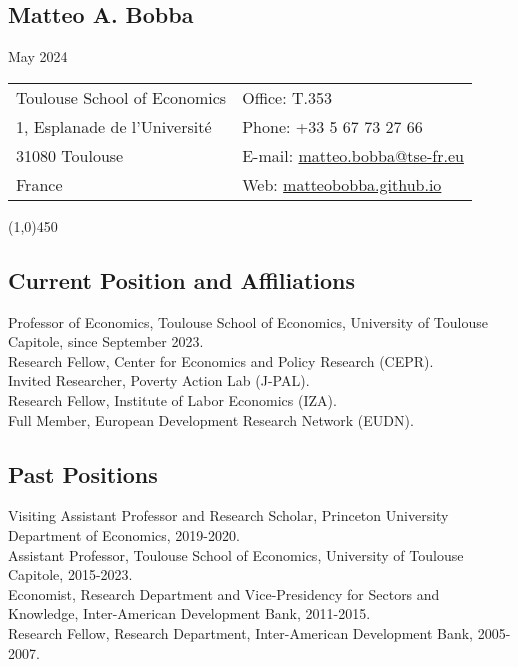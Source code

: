 \documentclass[12pt,english]{article}
\begin{document}


\noindent
\begin{center}
\section*{Matteo A. Bobba} \vspace{-0.3cm}
May 2024
\end{center} 
\begin{tabular}{p{9cm}p{9cm}}
Toulouse School of Economics &  Office: T.353  \\ 
1, Esplanade de l'Universit\'{e} & Phone: +33 5 67 73 27 66\\
31080 Toulouse  &  E-mail: \href{mailto: matteo.bobba@tse-fr.eu}{matteo.bobba@tse-fr.eu} \\
France & Web: \href{https://matteobobba.github.io/}{matteobobba.github.io}  \\
\end{tabular}
\vspace{-0.1cm}
\line(1,0){450} \\
\vspace{-0.3cm}

\subsection*{Current Position and Affiliations}
Professor of Economics, Toulouse School of Economics, University of Toulouse Capitole, since September 2023. \vspace{0.2cm} \\ 
Research Fellow, Center for Economics and Policy Research (CEPR).\vspace{0.2cm} \\
Invited Researcher, Poverty Action Lab (J-PAL). \vspace{0.2cm} \\ 
Research Fellow, Institute of Labor Economics (IZA). \vspace{0.2cm} \\ 
Full Member, European Development Research Network (EUDN).

\subsection*{Past Positions}
Visiting Assistant Professor and Research Scholar, Princeton University Department of Economics, 2019-2020. \vspace{0.2cm} \\
Assistant Professor, Toulouse School of Economics, University of Toulouse Capitole, 2015-2023. \vspace{0.2cm} \\ 
Economist, Research Department and Vice-Presidency for Sectors and Knowledge, Inter-American Development Bank, 2011-2015. \vspace{0.2cm} \\
Research Fellow, Research Department, Inter-American Development Bank, 2005-2007.
\end{document}
